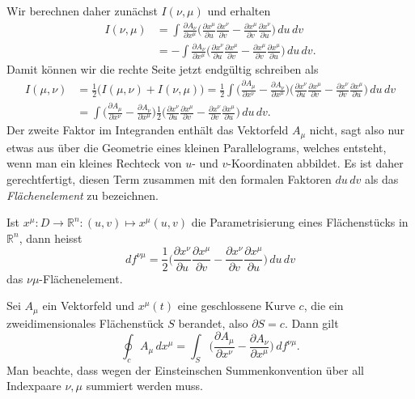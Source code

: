 Wir berechnen daher zunächst $I(\nu,\mu)$ und erhalten
\begin{align*}
I(\nu,\mu)
&=
\int
\frac{\partial A_\nu}{\partial x^\mu}
\biggl(\frac{\partial x^\mu}{\partial u}\frac{\partial x^\nu}{\partial v}
-
\frac{\partial x^\mu}{\partial v}\frac{\partial x^\nu}{\partial u}
\biggr)
\,du\,dv
\\
&=
-
\int
\frac{\partial A_\nu}{\partial x^\mu}
\biggl(\frac{\partial x^\nu}{\partial u}\frac{\partial x^\mu}{\partial v}
-
\frac{\partial x^\mu}{\partial v}\frac{\partial x^\mu}{\partial u}
\biggr)
\,du\,dv.
\end{align*}
Damit können wir die rechte Seite jetzt endgültig schreiben als
\begin{align*}
I(\mu,\nu)
&=
\frac12\biggl( I(\mu,\nu)+I(\nu,\mu)\biggr)
=
\frac12
\int
\biggl(
\frac{\partial A_\mu}{\partial x^\nu}
-
\frac{\partial A_\nu}{\partial x^\mu}
\biggr)
\biggl(
\frac{\partial x^\nu}{\partial u}\frac{\partial x^\mu}{\partial v}
-
\frac{\partial x^\nu}{\partial v}\frac{\partial x^\mu}{\partial u}
\biggr)
\,du\,dv
\\
&=
\int
\biggl(
\frac{\partial A_\mu}{\partial x^\nu}
-
\frac{\partial A_\nu}{\partial x^\mu}
\biggr)
\frac12
\biggl(
\frac{\partial x^\nu}{\partial u}\frac{\partial x^\mu}{\partial v}
-
\frac{\partial x^\nu}{\partial v}\frac{\partial x^\mu}{\partial u}
\biggr)
\,du\,dv.
\end{align*}
Der zweite Faktor im Integranden enthält das Vektorfeld $A_\mu$ nicht,
sagt also nur etwas aus über die Geometrie eines kleinen Parallelograms,
welches entsteht, wenn man ein kleines Rechteck von $u$- und $v$-Koordinaten
abbildet.
Es ist daher gerechtfertigt, diesen Term zusammen mit den formalen
Faktoren $du\,dv$ als das {\em Flächenelement} zu bezeichnen.
\begin{definition}
Ist $x^\mu\colon D\to\mathbb R^n:(u,v)\mapsto x^\mu(u,v)$ die Parametrisierung
eines Flächenstücks in $\mathbb R^n$, dann heisst 
\[
df^{\nu\mu}
=
\frac12
\biggl(
\frac{\partial x^\nu}{\partial u}\frac{\partial x^\mu}{\partial v}
-
\frac{\partial x^\nu}{\partial v}\frac{\partial x^\mu}{\partial u}
\biggr)
\,du\,dv
\]
das $\nu\mu$-Flächenelement.
\end{definition}

\begin{satz}[Stokes]
Sei $A_\mu$ ein Vektorfeld und $x^\mu(t)$ eine geschlossene Kurve $c$,
die ein zweidimensionales Flächenstück $S$ berandet, also $\partial S=c$.
Dann gilt
\[
\oint_c A_\mu\,dx^\mu
=
\int_S \biggl(
\frac{\partial A_\mu}{\partial x^\nu}-\frac{\partial A_\nu}{\partial x^\mu}
\biggr) \,df^{\nu\mu}.
\]
Man beachte, dass wegen der Einsteinschen Summenkonvention über all
Indexpaare $\nu,\mu$ summiert werden muss.
\end{satz}

